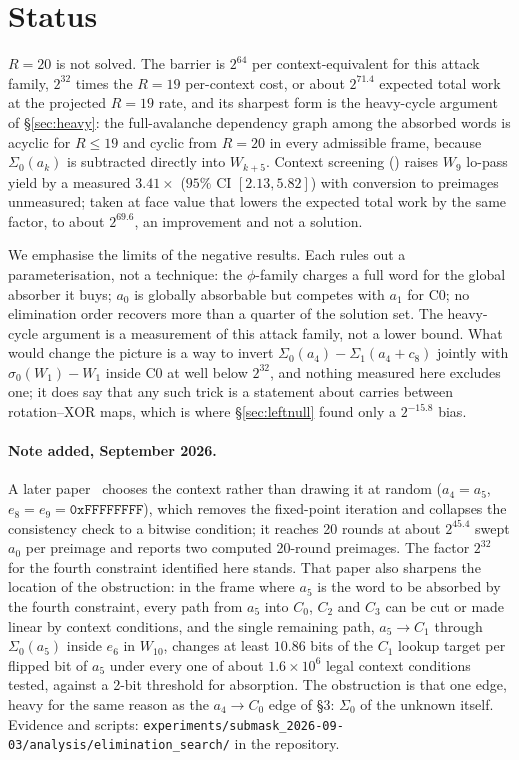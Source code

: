 \documentclass[11pt,a4paper]{article}
\newcommand{\Sig}[1]{\Sigma_{#1}}
\newcommand{\sig}[1]{\sigma_{#1}}
\begin{document}
\section{Status}

$R=20$ is not solved.  The barrier is $2^{64}$ per context-equivalent for
this attack family, $2^{32}$ times the $R{=}19$ per-context cost, or about
$2^{71.4}$ expected total work at the projected $R{=}19$ rate, and its
sharpest form is the heavy-cycle argument of \S\ref{sec:heavy}: the
full-avalanche dependency graph among the absorbed words is acyclic for
$R\le19$ and cyclic from $R{=}20$ in every admissible frame, because
$\Sig{0}(a_k)$ is subtracted directly into $W_{k+5}$.  Context screening
(\cite[\S5.7]{Basra2026R19}) raises $W_9$ lo-pass yield by a measured
$3.41\times$ ($95\%$ CI $[2.13,5.82]$) with conversion to preimages
unmeasured; taken at face value that lowers the expected total work by the
same factor, to about $2^{69.6}$, an improvement and not a solution.

We emphasise the limits of the negative results.  Each rules out a
parameterisation, not a technique: the $\phi$-family charges a full word for
the global absorber it buys; $a_0$ is globally absorbable but competes with
$a_1$ for C0; no elimination order recovers more than a quarter of the
solution set.  The heavy-cycle
argument is a measurement of this attack family, not a lower bound.  What
would change the picture is a way to invert $\Sig{0}(a_4)-\Sig{1}(a_4+c_8)$
jointly with $\sig{0}(W_1)-W_1$ inside C0 at well below $2^{32}$, and nothing
measured here excludes one; it does say that any such trick is a statement
about carries between rotation--XOR maps, which is where \S\ref{sec:leftnull}
found only a $2^{-15.8}$ bias.

\paragraph{Note added, September 2026.}
A later paper~\cite{Basra2026Submask} chooses the context rather than drawing
it at random ($a_4=a_5$, $e_8=e_9=\mathtt{0xFFFFFFFF}$), which removes the
fixed-point iteration and collapses the consistency check to a bitwise
condition; it reaches 20 rounds at about $2^{45.4}$ swept $a_0$ per preimage
and reports two computed 20-round preimages.  The factor $2^{32}$ for the
fourth constraint identified here stands.  That paper also sharpens the
location of the obstruction: in the frame where $a_5$ is the word to be
absorbed by the fourth constraint, every path from $a_5$ into $C_0$, $C_2$
and $C_3$ can be cut or made linear by context conditions, and the single
remaining path, $a_5\to C_1$ through $\Sigma_0(a_5)$ inside $e_6$ in $W_{10}$,
changes at least $10.86$ bits of the $C_1$ lookup target per flipped bit of
$a_5$ under every one of about $1.6\times10^{6}$ legal context conditions
tested, against a 2-bit threshold for absorption.  The obstruction is that
one edge, heavy for the same reason as the $a_4\to C_0$ edge of \S3:
$\Sigma_0$ of the unknown itself.  Evidence and scripts:
\texttt{experiments/submask\_2026-09-03/analysis/elimination\_search/} in the
repository.
\end{document}
